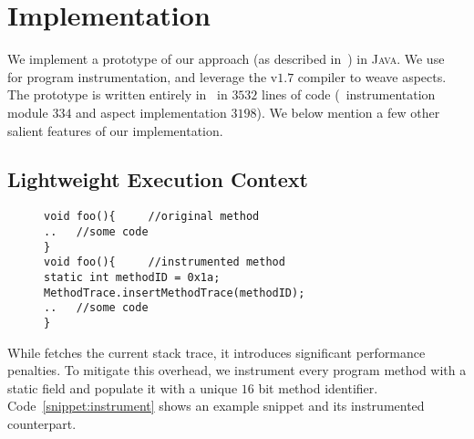 \section{Implementation}
\label{sec:implementation}


We implement a prototype of our approach (as described in~) 
in \textsc{Java}. We use \soot~\cite{soot} for program instrumentation, 
and leverage the  v$1.7$ compiler to weave aspects. The prototype
is written entirely in \java\ in $3532$ lines of code (\soot\ instrumentation
module $334$ and aspect implementation $3198$). We below mention a few other
salient features of our implementation.


% 

\subsection{Lightweight Execution Context}
\label{subsec:trace}

 \begin{figure}[t]
\begin{lstlisting}
void foo(){		//original method
..   //some code
}
void foo(){		//instrumented method
static int methodID = 0x1a;
MethodTrace.insertMethodTrace(methodID);
..   //some code
}
\end{lstlisting}
\end{figure}

While  fetches the current stack trace, it introduces 
significant performance penalties. To mitigate this overhead, we instrument 
every program method with a static  field and populate it with a 
unique $16$ bit method identifier. Code~\ref{snippet:instrument} shows an 
example snippet and its instrumented counterpart.
% 
% 

